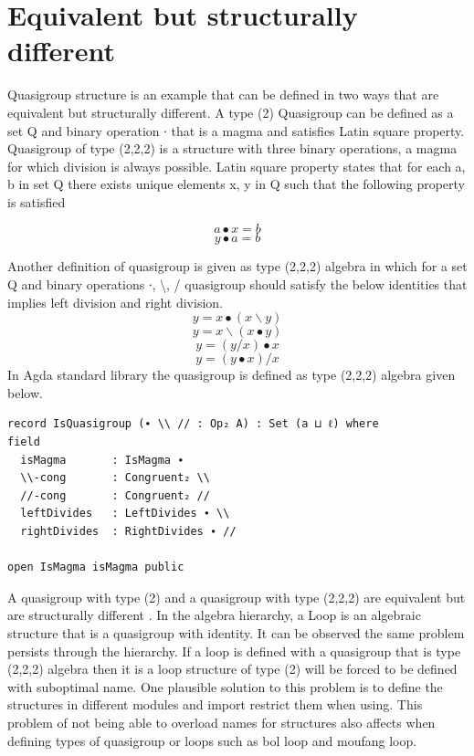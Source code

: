 \section{Equivalent but structurally different}
Quasigroup structure is an example that can be defined in two ways that are
equivalent but structurally different. A type (2) Quasigroup can be defined as a
set Q and binary operation ∙ that is a magma and satisfies Latin square
property. Quasigroup of type (2,2,2) is a structure with three binary
operations, a magma for which division is always possible. Latin square property
states that for each a, b in set Q there exists unique elements x, y in Q such
that the following property is satisfied
\cite{quasigroupWiki}
\begin{center}
\[a ∙ x = b\]
\[y ∙ a = b\]
\end{center}
Another definition of quasigroup is given as type (2,2,2) algebra in which for a
set Q and binary operations ∙, \textbackslash{}, / quasigroup should satisfy
the below identities that implies left division and right division. 
\[y = x ∙ (x \backslash y)\]
\[y = x \backslash (x ∙ y)\]
\[y = (y / x) ∙ x\]
\[y = (y ∙ x) / x\]
In Agda standard library the quasigroup is defined as type (2,2,2) algebra given
below.

\begin{verbatim}
record IsQuasigroup (∙ \\ // : Op₂ A) : Set (a ⊔ ℓ) where
field
  isMagma       : IsMagma ∙
  \\-cong       : Congruent₂ \\
  //-cong       : Congruent₂ //
  leftDivides   : LeftDivides ∙ \\
  rightDivides  : RightDivides ∙ //

open IsMagma isMagma public
\end{verbatim}

A quasigroup with type (2) and a quasigroup with type (2,2,2) are equivalent but
are structurally different \cite{flinn2021algebraic}. In the algebra hierarchy,
a Loop is an algebraic structure that is a quasigroup with identity. It can be
observed the same problem persists through the hierarchy. If a loop is defined
with a quasigroup that is type (2,2,2) algebra then it is a loop structure of
type (2) will be forced to be defined with suboptimal name. One plausible
solution to this problem is to define the structures in different modules and
import restrict them when using. This problem of not being able to overload
names for structures also affects when defining types of quasigroup or loops
such as bol loop and moufang loop.

